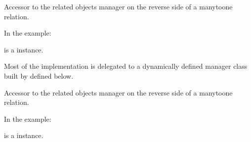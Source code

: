 \documentclass[letterpaper,10pt,english]{sphinxmanual}
\begin{document}
\begin{fulllineitems}
\begin{fulllineitems}
\label{\detokenize{accounts:accounts.models.User.linked_member}}
Accessor to the related objects manager on the reverse side of a
many\sphinxhyphen{}to\sphinxhyphen{}one relation.

In the example:

\begin{sphinxVerbatim}[commandchars=\\\{\}]
 
       
\end{sphinxVerbatim}

 is a  instance.

Most of the implementation is delegated to a dynamically defined manager
class built by  defined below.

\end{fulllineitems}


\begin{fulllineitems}
\label{\detokenize{accounts:accounts.models.User.logentry_set}}
Accessor to the related objects manager on the reverse side of a
many\sphinxhyphen{}to\sphinxhyphen{}one relation.

In the example:

\begin{sphinxVerbatim}[commandchars=\\\{\}]
 
       
\end{sphinxVerbatim}

 is a  instance.


\end{fulllineitems}
\end{fulllineitems}
\end{document}
